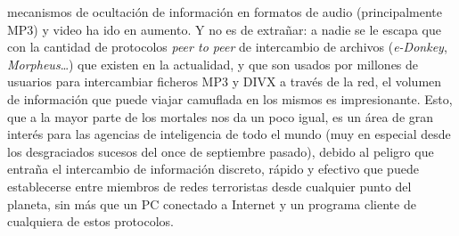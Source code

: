 mecanismos de ocultaci\'on de informaci\'on en formatos de audio 
(principalmente MP3) y video ha ido en aumento. Y no es de extra\~nar: a nadie 
se le escapa que con la cantidad de protocolos {\it peer to peer} de 
intercambio de archivos ({\it e-Donkey}, {\it Morpheus}\ldots) que existen en
la actualidad, y que son usados por millones de usuarios para intercambiar 
ficheros MP3 y DIVX a trav\'es de la red, el volumen de informaci\'on que puede 
viajar camuflada en los mismos es impresionante. Esto, que a la mayor parte de
los mortales nos da un poco igual, es un \'area de gran inter\'es para las 
agencias de inteligencia de todo el mundo (muy en especial desde los 
desgraciados sucesos del once de septiembre pasado), debido al peligro que 
entra\~na el intercambio de informaci\'on discreto, r\'apido y efectivo que
puede establecerse entre miembros de redes terroristas desde cualquier punto 
del planeta, sin m\'as que un PC conectado a Internet y un programa cliente de 
cualquiera de estos protocolos.
